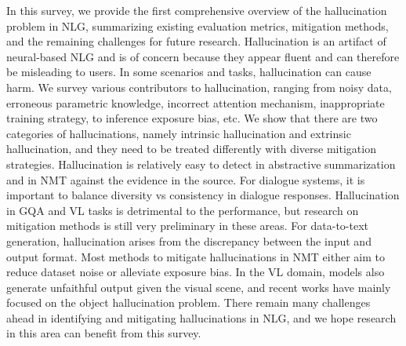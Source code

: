 \label{section:conclusion}
    In this survey, we provide the first comprehensive overview of the hallucination problem in NLG, summarizing existing evaluation metrics, mitigation methods, and the remaining challenges for future research. Hallucination is an artifact of neural-based NLG and is of concern because they appear fluent and can therefore be misleading to users. In some scenarios and tasks, hallucination can cause harm. We survey various contributors to hallucination, ranging from noisy data, erroneous parametric knowledge, incorrect attention mechanism, inappropriate training strategy, to inference exposure bias, etc. We show that there are two categories of hallucinations, namely intrinsic hallucination and extrinsic hallucination, and they need to be treated differently with diverse mitigation strategies. Hallucination is relatively easy to detect in abstractive summarization and in NMT against the evidence in the source. For dialogue systems, it is important to balance diversity vs consistency in dialogue responses. Hallucination in GQA and VL tasks is detrimental to the performance, but research on mitigation methods is still very preliminary in these areas. For data-to-text generation, hallucination arises from the discrepancy between the input and output format. Most methods to mitigate hallucinations in NMT either aim to reduce dataset noise or alleviate exposure bias. In the VL domain, models also generate unfaithful output given the visual scene, and recent works have mainly focused on the object hallucination problem. There remain many challenges ahead in identifying and mitigating hallucinations in NLG, and we hope research in this area can benefit from this survey.



\endinput